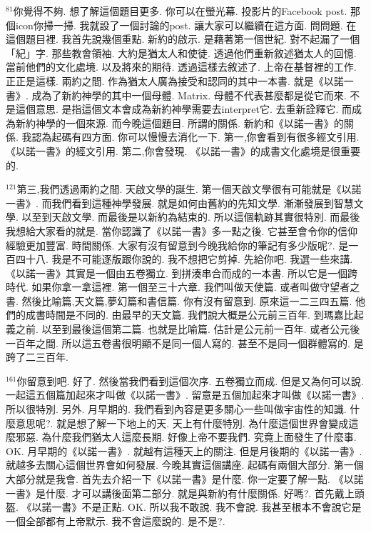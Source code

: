 \documentclass{book}
\begin{document}
$^{81}$你覺得不夠.
想了解這個題目更多.
你可以在螢光幕.
投影片的Facebook post.
那個icon你掃一掃.
我就設了一個討論的post.
讓大家可以繼續在這方面.
問問題.
在這個題目裡.
我首先說幾個重點.
新約的啟示.
是藉著第一個世紀.
對不起漏了一個「紀」字.
那些教會領袖.
大約是猶太人和使徒.
透過他們重新敘述猶太人的回憶.
當前他們的文化處境.
以及將來的期待.
透過這樣去敘述了.
上帝在基督裡的工作.
正正是這樣.
兩約之間.
作為猶太人廣為接受和認同的其中一本書.
就是《以諾一書》.
成為了新約神學的其中一個母體.
Matrix.
母體不代表甚麼都是從它而來.
不是這個意思.
是指這個文本會成為新約神學需要去interpret它.
去重新詮釋它.
而成為新約神學的一個來源.
而今晚這個題目.
所謂的關係.
新約和《以諾一書》的關係.
我認為起碼有四方面.
你可以慢慢去消化一下.
第一,你會看到有很多經文引用.
《以諾一書》的經文引用.
第二,你會發現.
《以諾一書》的成書文化處境是很重要的.

$^{121}$第三,我們透過兩約之間.
天啟文學的誕生.
第一個天啟文學很有可能就是《以諾一書》.
而我們看到這種神學發展.
就是如何由舊約的先知文學.
漸漸發展到智慧文學.
以至到天啟文學.
而最後是以新約為結束的.
所以這個軌跡其實很特別.
而最後我想給大家看的就是.
當你認識了《以諾一書》多一點之後.
它甚至會令你的信仰經驗更加豐富.
時間關係.
大家有沒有留意到今晚我給你的筆記有多少版呢?.
是一百四十八.
我是不可能逐版跟你說的.
我不想把它剪掉.
先給你吧.
我選一些來講.
《以諾一書》其實是一個由五卷獨立.
到拼湊串合而成的一本書.
所以它是一個跨時代.
如果你拿一拿這裡.
第一個至三十六章.
我們叫做天使篇.
或者叫做守望者之書.
然後比喻篇,天文篇,夢幻篇和書信篇.
你有沒有留意到.
原來這一二三四五篇.
他們的成書時間是不同的.
由最早的天文篇.
我們說大概是公元前三百年.
到瑪嘉比起義之前.
以至到最後這個第二篇.
也就是比喻篇.
估計是公元前一百年.
或者公元後一百年之間.
所以這五卷書很明顯不是同一個人寫的.
甚至不是同一個群體寫的.
是跨了二三百年.

$^{161}$你留意到吧.
好了.
然後當我們看到這個次序.
五卷獨立而成.
但是又為何可以說.
一起這五個篇加起來才叫做《以諾一書》.
留意是五個加起來才叫做《以諾一書》.
所以很特別.
另外.
月早期的.
我們看到內容是更多關心一些叫做宇宙性的知識.
什麼意思呢?.
就是想了解一下地上的天.
天上有什麼特別.
為什麼這個世界會變成這麼邪惡.
為什麼我們猶太人這麼長期.
好像上帝不要我們.
究竟上面發生了什麼事.
OK.
月早期的《以諾一書》.
就越有這種天上的關注.
但是月後期的《以諾一書》.
就越多去關心這個世界會如何發展.
今晚其實這個講座.
起碼有兩個大部分.
第一個大部分就是我會.
首先去介紹一下《以諾一書》是什麼.
你一定要了解一點.
《以諾一書》是什麼.
才可以講後面第二部分.
就是與新約有什麼關係.
好嗎?.
首先戴上頭盔.
《以諾一書》不是正點.
OK.
所以我不敢說.
我不會說.
我甚至根本不會說它是一個全部都有上帝默示.
我不會這麼說的.
是不是?.
\end{document}
